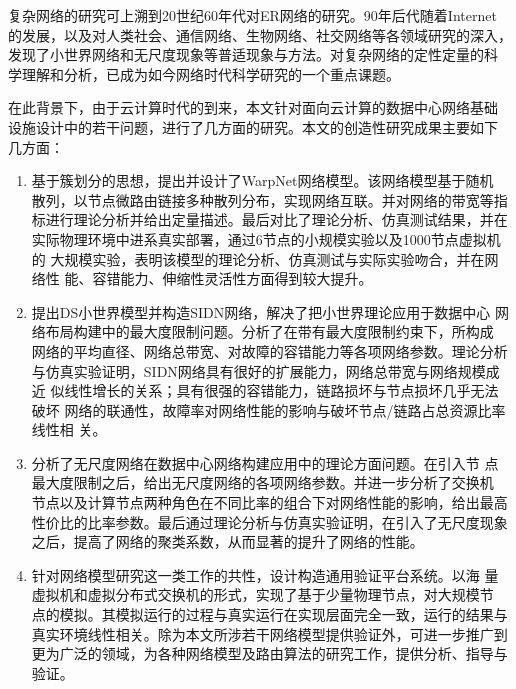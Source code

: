 \documentclass[phd,nobackinfo]{scutthesis}
\begin{document}
%
\begin{preface}

复杂网络的研究可上溯到20世纪60年代对ER网络的研究。90年后代随着Internet
的发展，以及对人类社会、通信网络、生物网络、社交网络等各领域研究的深入，
发现了小世界网络和无尺度现象等普适现象与方法。对复杂网络的定性定量的科
学理解和分析，已成为如今网络时代科学研究的一个重点课题。

在此背景下，由于云计算时代的到来，本文针对面向云计算的数据中心网络基础
设施设计中的若干问题，进行了几方面的研究。本文的创造性研究成果主要如下
几方面：

\begin{enumerate}
\item 基于簇划分的思想，提出并设计了WarpNet网络模型。该网络模型基于随机
  散列，以节点微路由链接多种散列分布，实现网络互联。并对网络的带宽等指
  标进行理论分析并给出定量描述。最后对比了理论分析、仿真测试结果，并在
  实际物理环境中进系真实部署，通过6节点的小规模实验以及1000节点虚拟机的
  大规模实验，表明该模型的理论分析、仿真测试与实际实验吻合，并在网络性
  能、容错能力、伸缩性灵活性方面得到较大提升。
\item 提出DS小世界模型并构造SIDN网络，解决了把小世界理论应用于数据中心
  网络布局构建中的最大度限制问题。分析了在带有最大度限制约束下，所构成
  网络的平均直径、网络总带宽、对故障的容错能力等各项网络参数。理论分析
  与仿真实验证明，SIDN网络具有很好的扩展能力，网络总带宽与网络规模成近
  似线性增长的关系；具有很强的容错能力，链路损坏与节点损坏几乎无法破坏
  网络的联通性，故障率对网络性能的影响与破坏节点/链路占总资源比率线性相
  关。
\item 分析了无尺度网络在数据中心网络构建应用中的理论方面问题。在引入节
  点最大度限制之后，给出无尺度网络的各项网络参数。并进一步分析了交换机
  节点以及计算节点两种角色在不同比率的组合下对网络性能的影响，给出最高
  性价比的比率参数。最后通过理论分析与仿真实验证明，在引入了无尺度现象
  之后，提高了网络的聚类系数，从而显著的提升了网络的性能。

\item 针对网络模型研究这一类工作的共性，设计构造通用验证平台系统。以海
  量虚拟机和虚拟分布式交换机的形式，实现了基于少量物理节点，对大规模节
  点的模拟。其模拟运行的过程与真实运行在实现层面完全一致，运行的结果与
  真实环境线性相关。除为本文所涉若干网络模型提供验证外，可进一步推广到
  更为广泛的领域，为各种网络模型及路由算法的研究工作，提供分析、指导与
  验证。
\end{enumerate}


\end{preface}
\end{document}

